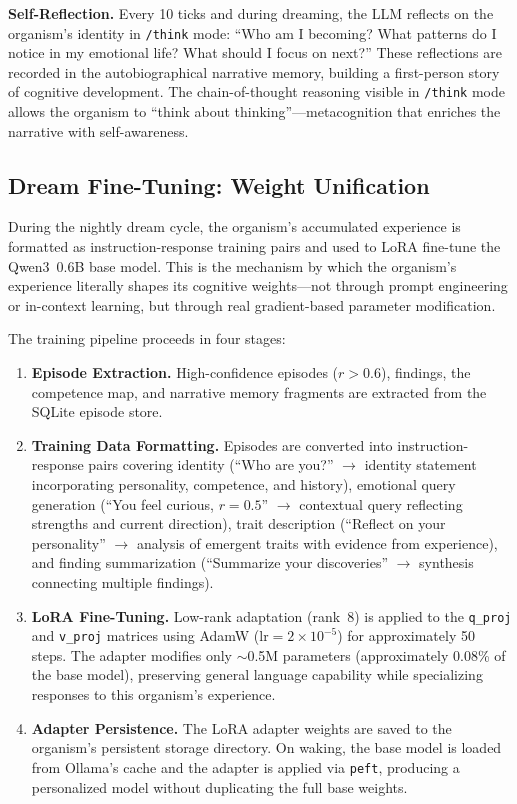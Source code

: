 \documentclass[11pt,a4paper,twocolumn]{article}
\begin{document}
\textbf{Self-Reflection.}
Every 10 ticks and during dreaming, the LLM reflects on the organism's identity in \texttt{/think} mode:
``Who am I becoming?
What patterns do I notice in my emotional life?
What should I focus on next?''
These reflections are recorded in the autobiographical narrative memory, building a first-person story of cognitive development.
The chain-of-thought reasoning visible in \texttt{/think} mode allows the organism to ``think about thinking''---metacognition that enriches the narrative with self-awareness.

\subsection{Dream Fine-Tuning: Weight Unification}

During the nightly dream cycle, the organism's accumulated experience is formatted as instruction-response training pairs and used to LoRA fine-tune the Qwen3~0.6B base model.
This is the mechanism by which the organism's experience literally shapes its cognitive weights---not through prompt engineering or in-context learning, but through real gradient-based parameter modification.

The training pipeline proceeds in four stages:
\begin{enumerate}
\item \textbf{Episode Extraction.} High-confidence episodes ($r > 0.6$), findings, the competence map, and narrative memory fragments are extracted from the SQLite episode store.
\item \textbf{Training Data Formatting.} Episodes are converted into instruction-response pairs covering identity (``Who are you?'' $\to$ identity statement incorporating personality, competence, and history), emotional query generation (``You feel curious, $r=0.5$'' $\to$ contextual query reflecting strengths and current direction), trait description (``Reflect on your personality'' $\to$ analysis of emergent traits with evidence from experience), and finding summarization (``Summarize your discoveries'' $\to$ synthesis connecting multiple findings).
\item \textbf{LoRA Fine-Tuning.} Low-rank adaptation (rank~8) is applied to the \texttt{q\_proj} and \texttt{v\_proj} matrices using AdamW ($\mathrm{lr} = 2 \times 10^{-5}$) for approximately 50 steps. The adapter modifies only $\sim$0.5M parameters (approximately 0.08\% of the base model), preserving general language capability while specializing responses to this organism's experience.
\item \textbf{Adapter Persistence.} The LoRA adapter weights are saved to the organism's persistent storage directory. On waking, the base model is loaded from Ollama's cache and the adapter is applied via \texttt{peft}, producing a personalized model without duplicating the full base weights.
\end{enumerate}
\end{document}
